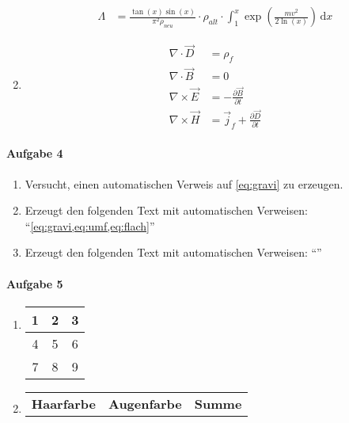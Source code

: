 \documentclass[ngerman, a4paper, 12pt]{scrartcl}
\begin{document}
\begin{enumerate}
\begin{align*}
        \Lambda &= \frac{\tan(x)\sin(x)}{\pi^2\rho_{neu}} \cdot \rho_{alt}
          \cdot \int_1^x \exp\left( \frac{mv^2}{2\ln(x)} \right) \,
          \mathrm{d}x
    \end{align*}
\item
    \begin{align}
        \nabla\cdot \vec{D} &= \rho_f \\
        \nabla\cdot \vec{B} &= 0 \\
        \nabla\times \vec{E} &= -\frac{\partial \vec{B}}{\partial t} \\
        \nabla\times \vec{H} &= \vec{j}_f+\frac{\partial \vec{D}}{\partial t}
    \end{align}
\end{enumerate}
\paragraph{Aufgabe 4}
\begin{enumerate}
    \item Versucht, einen automatischen Verweis auf \cref{eq:gravi} zu
        erzeugen.
    \item Erzeugt den folgenden Text mit automatischen Verweisen:
        ``\cref{eq:gravi,eq:umf,eq:flach}''
    \item Erzeugt den folgenden Text mit automatischen Verweisen:
        ``''
\end{enumerate}
\paragraph{Aufgabe 5}
\begin{enumerate}
    \item 
        \begin{tabular}{| c c || c |}
            \hline
            1 & 2 & 3 \\
            \hline \hline
            4 & 5 & 6 \\
            7 & 8 & 9 \\ \hline
        \end{tabular}
    \item
        \begin{tabular}{l | l l l l | l}
            \textbf{Haarfarbe} & \multicolumn{4}{c}{\textbf{Augenfarbe}} &
            \textbf{Summe} \\
        \end{tabular}
\end{enumerate}
\end{document}

